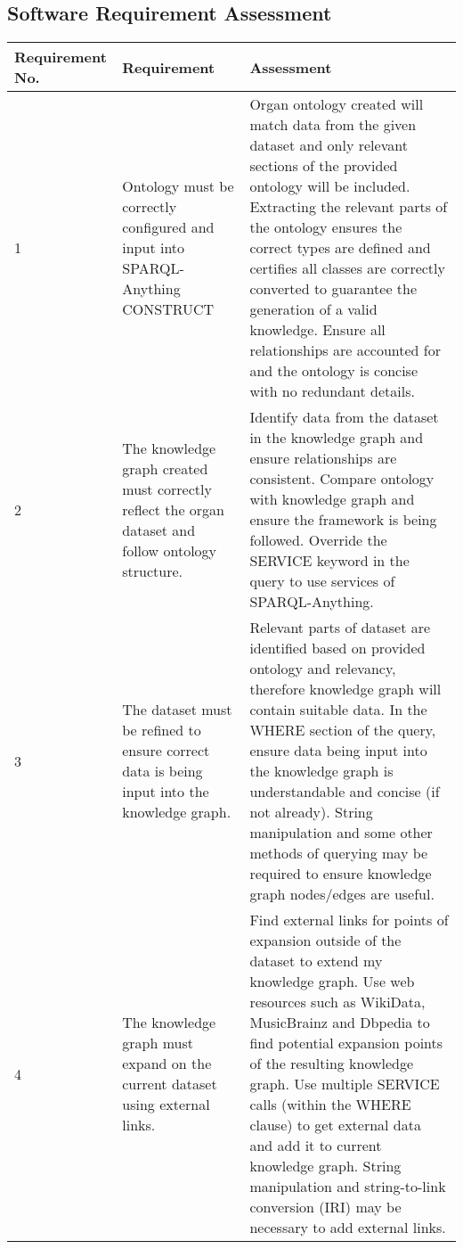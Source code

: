 \subsection{Software Requirement Assessment}
\begin{longtable}{|p{2.25cm}|p{5.5cm}|p{5.5cm}|}

\hline
\textbf{Requirement No.} & \textbf{Requirement} & \textbf{Assessment}\\
\hline

1& 
Ontology must be correctly configured and input into SPARQL-Anything CONSTRUCT &
Organ ontology created will match data from the given dataset and only relevant sections of the provided ontology will be included. Extracting the relevant parts of the ontology ensures the correct types are defined and certifies all classes are correctly converted to guarantee the generation of a valid knowledge. Ensure all relationships are accounted for and the ontology is concise with no redundant details. \\
\hline

2&
The knowledge graph created must correctly reflect the organ dataset and follow ontology structure. &
Identify data from the dataset in the knowledge graph and ensure relationships are consistent. Compare ontology with knowledge graph and ensure the framework is being followed. Override the SERVICE keyword in the query to use services of SPARQL-Anything. \\
\hline

3&
The dataset must be refined to ensure correct data is being input into the knowledge graph. &
Relevant parts of dataset are identified based on provided ontology and relevancy, therefore knowledge graph will contain suitable data. In the WHERE section of the query, ensure data being input into the knowledge graph is understandable and concise (if not already). String manipulation and some other methods of querying may be required to ensure knowledge graph nodes/edges are useful. \\
\hline

4&
The knowledge graph must expand on the current dataset using external links. &
Find external links for points of expansion outside of the dataset to extend my knowledge graph. Use web resources such as WikiData, MusicBrainz and Dbpedia to find potential expansion points of the resulting knowledge graph. Use multiple SERVICE calls (within the WHERE clause) to get external data and add it to current knowledge graph. String manipulation and string-to-link conversion (IRI) may be necessary to add external links. \\
\hline


\end{longtable}
